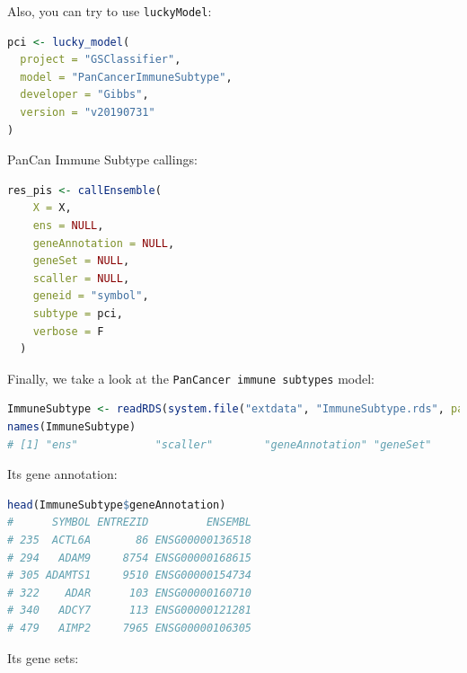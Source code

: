 \documentclass[
  12pt,
]{book}
\newcommand{\passthrough}[1]{#1}
\begin{document}
Also, you can try to use \passthrough{\lstinline!luckyModel!}:

\begin{lstlisting}[language=R]
pci <- lucky_model(
  project = "GSClassifier",
  model = "PanCancerImmuneSubtype",
  developer = "Gibbs",
  version = "v20190731"
)
\end{lstlisting}

PanCan Immune Subtype callings:

\begin{lstlisting}[language=R]
res_pis <- callEnsemble(
    X = X,
    ens = NULL,
    geneAnnotation = NULL,
    geneSet = NULL,
    scaller = NULL,
    geneid = "symbol",
    subtype = pci,
    verbose = F
  )
\end{lstlisting}

Finally, we take a look at the \passthrough{\lstinline!PanCancer immune subtypes!} model:

\begin{lstlisting}[language=R]
ImmuneSubtype <- readRDS(system.file("extdata", "ImmuneSubtype.rds", package = "GSClassifier"))
names(ImmuneSubtype)
# [1] "ens"            "scaller"        "geneAnnotation" "geneSet"
\end{lstlisting}

Its gene annotation:

\begin{lstlisting}[language=R]
head(ImmuneSubtype$geneAnnotation)
#      SYMBOL ENTREZID         ENSEMBL
# 235  ACTL6A       86 ENSG00000136518
# 294   ADAM9     8754 ENSG00000168615
# 305 ADAMTS1     9510 ENSG00000154734
# 322    ADAR      103 ENSG00000160710
# 340   ADCY7      113 ENSG00000121281
# 479   AIMP2     7965 ENSG00000106305
\end{lstlisting}

Its gene sets:
\end{document}

